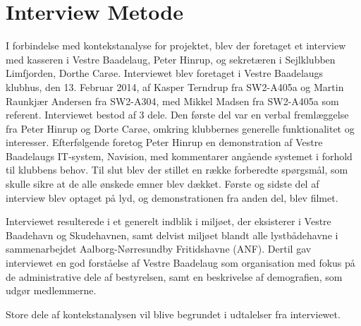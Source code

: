 \section{Interview Metode}

I forbindelse med kontekstanalyse for projektet, blev der foretaget et interview med kasseren i Vestre Baadelaug, Peter Hinrup, og sekretæren i Sejlklubben Limfjorden, Dorthe Carøe. Interviewet blev foretaget i Vestre Baadelaugs klubhus, den 13. Februar 2014, af Kasper Terndrup fra SW2-A405a og Martin Raunkjær Andersen fra SW2-A304, med Mikkel Madsen fra SW2-A405a som referent. Interviewet bestod af 3 dele. Den første del var en verbal fremlæggelse fra Peter Hinrup og Dorte Carøe, omkring klubbernes generelle funktionalitet og interesser. Efterfølgende foretog Peter Hinrup en demonstration af Vestre Baadelaugs IT-system, Navision, med kommentarer angående systemet i forhold til klubbens behov. Til slut blev der stillet en række forberedte spørgsmål, som skulle sikre at de alle ønskede emner blev dækket. Første og sidste del af interview blev optaget på lyd, og demonstrationen fra anden del, blev filmet.

Interviewet resulterede i et generelt indblik i miljøet, der eksisterer i Vestre Baadehavn og Skudehavnen, samt delvist miljøet blandt alle lystbådehavne i sammenarbejdet Aalborg-Nørresundby Fritidshavne (ANF). Dertil gav interviewet en god forståelse af Vestre Baadelaug som organisation med fokus på de administrative dele af bestyrelsen, samt en beskrivelse af demografien, som udgør medlemmerne.

Store dele af kontekstanalysen vil blive begrundet i udtalelser fra interviewet.

